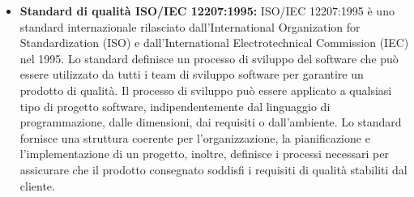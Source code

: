 \begin{itemize}
\item \textbf{Standard di qualità ISO/IEC 12207:1995:} ISO/IEC 12207:1995 è uno standard internazionale rilasciato dall'International Organization 
for Standardization (ISO) e dall'International Electrotechnical Commission (IEC) nel 1995. 
Lo standard definisce un processo di sviluppo del software che può essere utilizzato da tutti i team di sviluppo software per garantire 
un prodotto di qualità. Il processo di sviluppo può essere applicato a qualsiasi tipo di progetto software, indipendentemente dal 
linguaggio di programmazione, dalle dimensioni, dai requisiti o dall'ambiente. 
Lo standard fornisce una struttura coerente per l'organizzazione, la pianificazione e l'implementazione di un progetto, 
inoltre, definisce i processi necessari per assicurare che il prodotto consegnato soddisfi i requisiti di qualità stabiliti dal cliente.
\end{itemize}